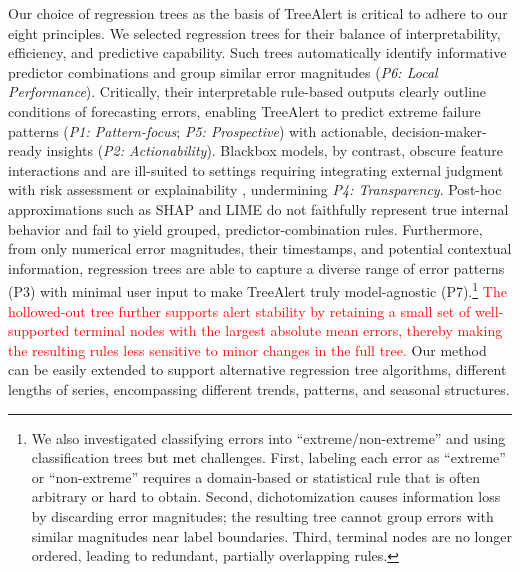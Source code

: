 \documentclass[12pt]{article}
\newcommand{\galit}[1]{\textcolor{black}{#1}}
\newcommand{\matt}[1]{\textcolor{red}{#1}}
\begin{document}
Our %
choice of regression trees as the basis of TreeAlert is %
critical to adhere to our eight principles. %
We selected regression trees for their balance of interpretability, efficiency, and predictive capability. Such trees automatically identify informative predictor combinations and group similar error magnitudes (\emph{P6: Local Performance}). Critically, their interpretable rule-based outputs clearly outline conditions %
of forecasting errors, %
enabling TreeAlert to predict extreme failure patterns (\emph{P1: Pattern-focus}; \emph{P5: Prospective}) with actionable, decision-maker-ready insights (\emph{P2: Actionability}). Blackbox models, by contrast, obscure feature interactions %
and are ill-suited to settings requiring integrating external judgment with risk assessment or explainability \citep{rudin2019, houssainy2021}, undermining \emph{P4: Transparency}. Post-hoc approximations such as SHAP and LIME do not faithfully represent true internal behavior \citep{rudin2019} and fail to yield grouped, predictor-combination rules. Furthermore, from only numerical error magnitudes, their timestamps, and potential contextual information, regression trees are able to capture a diverse range of error patterns (P3) with minimal user input to make TreeAlert truly model-agnostic (P7).\footnote{We also investigated classifying errors into “extreme/non-extreme” and using classification trees \galit{but met} %
challenges. First, labeling each error as “extreme” or “non-extreme” requires a domain-based or statistical rule that is often arbitrary or hard to obtain. Second, dichotomization causes information loss by discarding error magnitudes; the resulting tree cannot group errors with similar magnitudes near label boundaries. Third, terminal nodes are no longer ordered, leading to redundant, partially overlapping rules.}
\matt{The hollowed-out tree further supports alert stability by retaining a small set of well-supported terminal nodes with the largest absolute mean errors, thereby making the resulting rules less sensitive to minor changes in the full tree.}
Our method can be easily extended to support alternative regression tree algorithms, different lengths of series, encompassing different trends, patterns, and seasonal structures.
\end{document}
